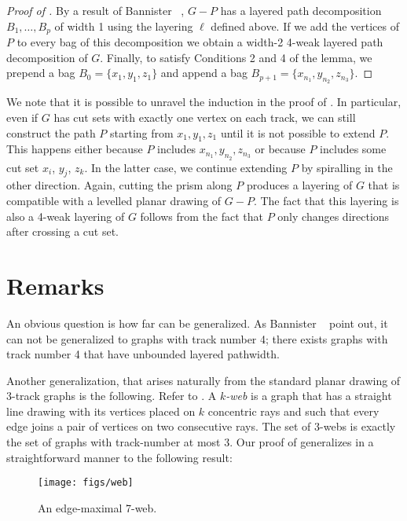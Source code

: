 \documentclass{patmorin}
\begin{document}
\begin{proof}[Proof of ]
  By a result of Bannister \etal\ \cite[Proof of
  Theorem~5]{bannister.devanny.ea:track}, $G-P$ has a layered
  path decomposition $B_1,\ldots,B_p$ of width 1 using the layering 
  $\ell$ defined above.  If we add the vertices of $P$ to every bag
  of this decomposition we obtain a width-2 4-weak layered path
  decomposition of $G$.  Finally, to satisfy Conditions 2 and 4 of
  the lemma, we prepend a bag $B_0=\{x_1,y_1,z_1\}$ and append a bag
  $B_{p+1}=\{x_{n_1},y_{n_2},z_{n_3}\}$.
\end{proof}

We note that it is possible to unravel the induction in the proof of
.  In particular, even if $G$ has cut sets with exactly
one vertex on each track, we can still construct the path $P$ starting
from $x_1,y_1,z_1$ until it is not possible to extend $P$. This happens
either because $P$ includes $x_{n_1},y_{n_2},z_{n_3}$ or because $P$
includes some cut set $x_i$, $y_j$, $z_k$.  In the latter case, we
continue extending $P$ by spiralling in the other direction.  Again,
cutting the prism along $P$ produces a layering of $G$ that is compatible
with a levelled planar drawing of $G-P$.  The fact that this layering is
also a 4-weak layering of $G$ follows from the fact that $P$ only changes
directions after crossing a cut set.


\section{Remarks}

An obvious question is how far  can be generalized. As
Bannister \etal\ \cite{bannister.devanny.ea:track} point out, it can
not be generalized to graphs with track number 4; there exists graphs
with track number 4 that have unbounded layered pathwidth.

Another generalization, that arises naturally from the standard planar
drawing of 3-track graphs is the following. Refer to .
A \emph{$k$-web} is a graph that has a straight line drawing with its
vertices placed on $k$ concentric rays and such that every edge joins a
pair of vertices on two consecutive rays.  The set of 3-webs is exactly
the set of graphs with track-number at most 3.  Our proof of 
generalizes in a straightforward manner to the following result:

\begin{figure}
  \begin{center}
    \texttt{[image: figs/web]}
  \end{center}
  \caption{An edge-maximal 7-web.}
\end{figure}
\end{document}
